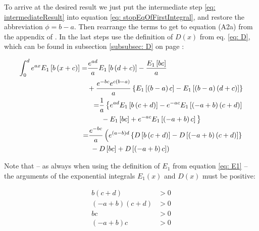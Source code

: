 \documentclass[bibliography=totocnumbered]{scrartcl}
\begin{document}
	To arrive at the desired result we just put the intermediate step \eqref{eq: intermediateResult} into equation \eqref{eq: stopEqOfFirstIntegral}, and restore the abbreviation $\phi=b-a$. Then rearrange the terms to get to equation (A2a) from the appendix of \cite{boer1990calc}. In the last steps use the definition of $D\left(x\right)$ from eq. \eqref{eq: D}, which can be found in subsection \ref{subsubsec: D} on page \pageref{subsubsec: D}:
	
	\begin{align}
			\begin{split}
				\int_{0}^{d}e^{ax}E_1\left[b\left(x+c\right)\right]=&\frac{e^{ad}}{a}E_1\left[b\left(d+c\right)\right]-\frac{E_1\left[bc\right]}{a}\\
				&+\frac{e^{-bc}e^{c\left(b-a\right)}}{a}\left\{E_1\left[\left(b-a\right)c\right]-E_1\left[\left(b-a\right)\left(d+c\right)\right]\right\}
			\end{split}\\
			\begin{split}
				=&\frac{1}{a}\left\{e^{ad}E_1\left[b\left(c+d\right)\right]-e^{-ac}E_1\left[\left(-a+b\right)\left(c+d\right)\right]\right. \\
				&\left. {}-E_1\left[bc\right]+e^{-ac}E_1\left[\left(-a+b\right)c\right]\vphantom{e^{ad}}\right\}
			\end{split}\\
			\begin{split}
				=&\frac{e^{-bc}}{a}\left(e^{\left(a-b\right)d}\left\{D\left[b\left(c+d\right)\right]-D\left[\left(-a+b\right)\left(c+d\right)\right]\right\}\right.\\
				&\left. {}-D\left[bc\right]+D\left[\left(-a+b\right)c\right]\right)\label{eq: generalIntegralOfE1}
			\end{split}
	\end{align}
	
	Note that -- as always when using the definition of $E_1$ from equation \eqref{eq: E1}  -- the arguments of the exponential integrals $E_1\left(x\right)$ and $D\left(x\right)$ must be positive:
	
	\begin{subequations}
	\begin{align}
		b\left(c+d\right)&>0\\
		\left(-a+b\right)\left(c+d\right)&>0\\
		bc&>0\label{eq: conditionForC1}\\
		\left(-a+b\right)c&>0\label{eq: conditionForC2}
	\end{align}
	\end{subequations}
	
\end{document}
